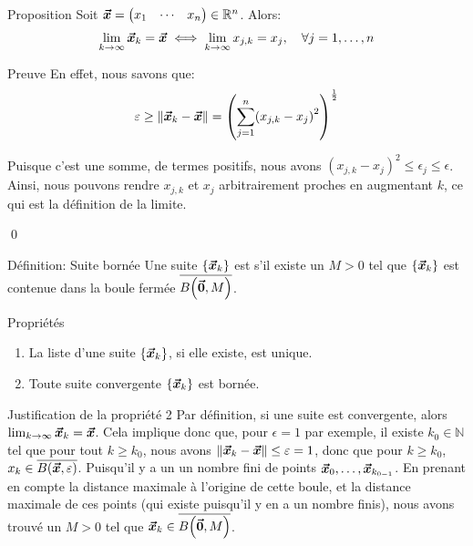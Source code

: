 \documentclass[a4paper]{article}
\begin{document}
\begin{parag}{Proposition}
    Soit $\bm{\protect\vec{x}} = \begin{pmatrix} x_1 & \cdots & x_n \end{pmatrix} \in \mathbb{R}^n$. Alors:
    \[\lim_{k \to \infty} \bm{\protect\vec{x}}_k = \bm{\protect\vec{x}} \iff \lim_{k \to \infty} x_{j, k} = x_j, \quad \forall j = 1, \ldots, n\]


    \begin{subparag}{Preuve}
        En effet, nous savons que: 
        \[\epsilon \geq \left\|\bvec{x}_k - \bvec{x}\right\| = \left(\sum_{j=1}^{n} \left(x_{j, k} - x_{j}\right)^2\right)^{\frac{1}{2}}\]

        Puisque c'est une somme, de termes positifs, nous avons $\left(x_{j, k} - x_{j}\right)^2 \leq \epsilon_j \leq \epsilon$. Ainsi, nous pouvons rendre $x_{j,k}$ et $x_j$ arbitrairement proches en augmentant $k$, ce qui est la définition de la limite.

        \qed
    \end{subparag}
\end{parag}


\begin{parag}{Définition: Suite bornée}
    Une suite $\left\{\bvec{x}_k\right\}$ est  s'il existe un $M > 0$ tel que $\left\{\bvec{x}_k\right\}$ est contenue dans la boule fermée $\bar{B\left(\bvec{0}, M\right)}$.
\end{parag}


\begin{parag}{Propriétés}
    \begin{enumerate}[left=0pt]
        \item La liste d'une suite $\left\{\bvec{x}_k\right\}$, si elle existe, est unique.
        \item Toute suite convergente $\left\{\bvec{x}_k\right\}$ est bornée.
    \end{enumerate}
    
    \begin{subparag}{Justification de la propriété 2}
        Par définition, si une suite est convergente, alors $\lim_{k \to \infty} \bm{\protect\vec{x}}_k = \bm{\protect\vec{x}}$. Cela implique donc que, pour $\epsilon = 1$ par exemple, il existe $k_0 \in \mathbb{N}$ tel que pour tout $k \geq k_0$, nous avons $\left\|\bvec{x}_k - \bvec{x}\right\| \leq\epsilon = 1$, donc que pour $k \geq k_0$, $x_k \in \bar{B\left(\bvec{x}, \epsilon\right)}$. Puisqu'il y a un un nombre fini de points $\bm{\protect\vec{x}}_0, \ldots, \bm{\protect\vec{x}}_{k_{0 - 1}}$. En prenant en compte la distance maximale à l'origine de cette boule, et la distance maximale de ces points (qui existe puisqu'il y en a un nombre finis), nous avons trouvé un $M > 0$ tel que $\bvec{x}_k \in \bar{B\left(\bvec{0}, M\right)}$.

    \end{subparag}
\end{parag}
\end{document}
